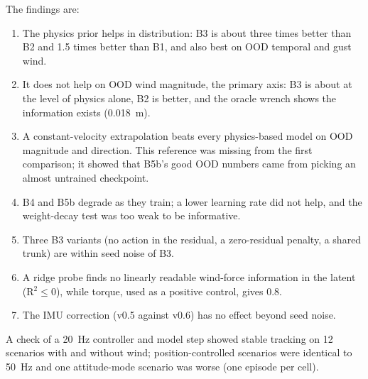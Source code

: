 \documentclass[conference]{IEEEtran}
\begin{document}
The findings are:
\begin{enumerate}
\item The physics prior helps in distribution: B3 is about three times better than B2 and 1.5 times better than B1, and also best on OOD temporal and gust wind.
\item It does not help on OOD wind magnitude, the primary axis: B3 is about at the level of physics alone, B2 is better, and the oracle wrench shows the information exists (0.018~m).
\item A constant-velocity extrapolation beats every physics-based model on OOD magnitude and direction. This reference was missing from the first comparison; it showed that B5b's good OOD numbers came from picking an almost untrained checkpoint.
\item B4 and B5b degrade as they train; a lower learning rate did not help, and the weight-decay test was too weak to be informative.
\item Three B3 variants (no action in the residual, a zero-residual penalty, a shared trunk) are within seed noise of B3.
\item A ridge probe finds no linearly readable wind-force information in the latent (R$^2\le0$), while torque, used as a positive control, gives 0.8.
\item The IMU correction (v0.5 against v0.6) has no effect beyond seed noise.
\end{enumerate}
A check of a 20~Hz controller and model step showed stable tracking on 12 scenarios with and without wind; position-controlled scenarios were identical to 50~Hz and one attitude-mode scenario was worse (one episode per cell).
\end{document}
